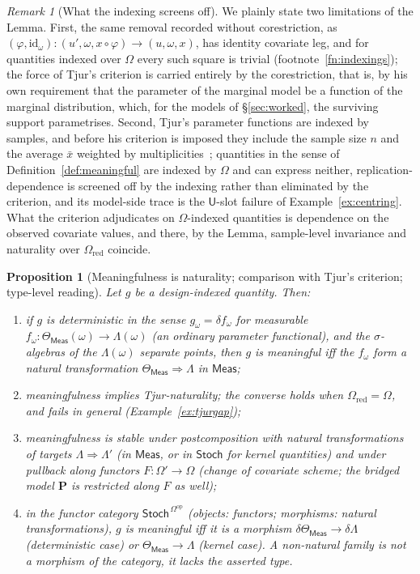 \documentclass[11pt,a4paper]{article}
\theoremstyle{plain}
\newtheorem{proposition}[theorem]{Proposition}
\theoremstyle{definition}
\theoremstyle{remark}
\newtheorem{remark}[theorem]{Remark}
\newcommand{\cat}[1]{\mathsf{#1}}
\newcommand{\catU}{\cat{U}}
\newcommand{\catO}{\cat{\Omega}}
\newcommand{\Meas}{\cat{Meas}}
\newcommand{\Stoch}{\cat{Stoch}}
\newcommand{\op}{\mathrm{op}}
\newcommand{\id}{\mathrm{id}}
\newcommand{\del}{\delta}
\begin{document}
\begin{remark}[What the indexing screens off]\label{rem:tjurscope}
We plainly state two limitations of the Lemma. First, the same
removal recorded without corestriction, as
$(\varphi,\id_\omega) \colon (u',\omega,x\circ\varphi) \to (u,\omega,x)$, has
identity covariate leg, and for quantities indexed over $\catO$ every such
square is trivial (footnote~\ref{fn:indexings}); the force of Tjur's
criterion is carried entirely by the corestriction, that is, by his own
requirement that the parameter of the marginal model be a function of the
marginal distribution, which, for the models of \S\ref{sec:worked}, the
surviving support parametrises. Second, Tjur's parameter functions are
indexed by samples, and before his criterion is imposed they include the
sample size $n$ and the average $\bar x$ weighted by
multiplicities~\cite[p.~1299]{tjur_discussion_2002}; quantities in the sense
of Definition~\ref{def:meaningful} are indexed by $\catO$ and can express
neither, replication-dependence is screened off by the indexing rather
than eliminated by the criterion, and its model-side trace is the
$\catU$-slot failure of Example~\ref{ex:centring}. What the criterion
adjudicates on $\catO$-indexed quantities is dependence on the observed
covariate values, and there, by the Lemma, sample-level invariance and
naturality over $\catO_{\mathrm{red}}$ coincide.
\end{remark}

\begin{proposition}[Meaningfulness is naturality; comparison with Tjur's
criterion; type-level reading]\label{prop:tjur}
Let $g$ be a design-indexed quantity. Then:
\begin{enumerate}
\item if $g$ is deterministic in the sense $g_\omega = \del f_\omega$ for
measurable $f_\omega \colon \Theta_\Meas(\omega) \to \Lambda(\omega)$ (an
ordinary parameter functional), and the $\sigma$-algebras of the
$\Lambda(\omega)$ separate points, then $g$ is meaningful iff the $f_\omega$
form a natural transformation $\Theta_\Meas \Rightarrow \Lambda$ in $\Meas$;
\item[(1$'$)] meaningfulness implies Tjur-naturality; the converse holds when
$\catO_{\mathrm{red}} = \catO$, and fails in general
(Example~\ref{ex:tjurgap});
\item meaningfulness is stable under postcomposition with natural
transformations of targets $\Lambda \Rightarrow \Lambda'$ (in $\Meas$, or in
$\Stoch$ for kernel quantities) and under pullback along functors
$F \colon \catO' \to \catO$ (change of covariate scheme; the bridged model
$\mathbf{P}$ is restricted along $F$ as well);
\item in the functor category
$\Stoch^{\,\catO^{\op}}$ (objects: functors; morphisms: natural
transformations), $g$ is meaningful iff it \emph{is} a morphism
$\del\Theta_\Meas \to \del\Lambda$ (deterministic case) or
$\Theta_\Meas \to \Lambda$ (kernel case). A non-natural family is not a
morphism of the category, it lacks the asserted type.
\end{enumerate}
\end{proposition}
\end{document}
